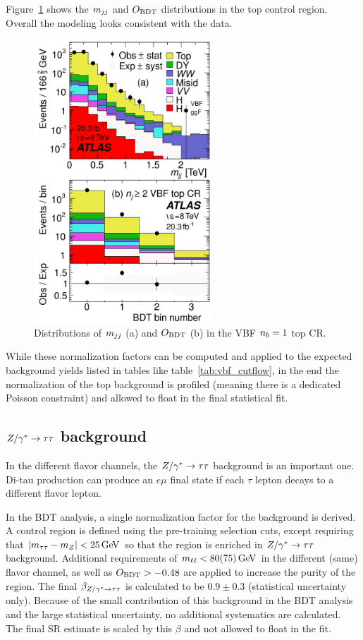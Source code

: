 Figure~\ref{fig:vbf_top_cr} shows the $m_{jj}$ and $O_{\rm BDT}$ distributions in the top control region. Overall the modeling looks consistent with the data.

\begin{figure}[h!]
  \centering
  \captionsetup{justification=centering}
  \includegraphics[width=0.6\textwidth]{figures/VBF_topcr}
  \caption{Distributions of $m_{jj}$ (a) and $O_{\rm BDT}$ (b) in the VBF $n_b = 1$ top CR\cite{WW2015}.}
  \label{fig:vbf_top_cr}
\end{figure}

While these normalization factors can be computed and applied to the expected background yields listed in tables like table~\ref{tab:vbf_cutflow}, in the end the normalization of the top background is profiled (meaning there is a dedicated Poisson constraint) and allowed to float in the final statistical fit. 

\subsection{$Z/\gamma^{\ast} \to \tau\tau$ background}

In the different flavor channels, the $Z/\gamma^{\ast} \to \tau\tau$ background is an important one. Di-tau production can produce an $e\mu$ final state if each $\tau$ lepton decays to a different flavor lepton. 

In the BDT analysis, a single normalization factor for the background is derived. A control region is defined using the pre-training selection cuts, except requiring that $|\mtt - m_Z| < 25 \GeV$ so that the region is enriched in $Z/\gamma^{\ast} \to \tau\tau$ background. Additional requirements of $\mll < 80 (75) \GeV$ in the different (same) flavor channel, as well as $O_{\rm BDT} > -0.48$ are applied to increase the purity of the region. The final $\beta_{Z/\gamma^{\ast} \to \tau\tau}$ is calculated to be $0.9 \pm 0.3$ (statistical uncertainty only). Because of the small contribution of this background in the BDT analysis and the large statistical uncertainty, no additional systematics are calculated. The final SR estimate is scaled by this $\beta$ and not allowed to float in the fit. 

